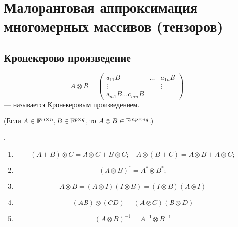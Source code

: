 \section{Малоранговая аппроксимация многомерных массивов (тензоров)}

\subsection{Кронекерово произведение}

\begin{definition}
    \[
        A \otimes B = \begin{pmatrix}
            a_{1 1} B & \dots & a_{1 n} B \\
            \vdots & & \vdots \\
            a_{m 1} B \dots a_{m n} B
        \end{pmatrix}
    \]
    --- называется Кронекеровым произведением.
\end{definition}

(Если $A \in \mathbb{F}^{m \times n}, B \in \mathbb{F}^{p \times q}$, то
$A \otimes B \in \mathbb{F}^{m p \times n q}$.)

\begin{point} .
    \begin{enumerate}
    \item
        \[
            (A + B) \otimes C = A \otimes C + B \otimes C; \quad
            A \otimes (B + C) = A \otimes B + A \otimes C;
        \]
    \item
        \[
            (A \otimes B)^* = A^* \otimes B^*;
        \]
    \item
        \[
            A \otimes B = (A \otimes I) (I \otimes B)
            = (I \otimes B) (A \otimes I)
        \]
    \item
        \[
            (A B) \otimes (C D) = (A \otimes C) (B \otimes D)
        \]
    \item
        \[
            (A \otimes B)^{-1} = A^{-1} \otimes B^{-1}
        \]
    \end{enumerate}
\end{point}

